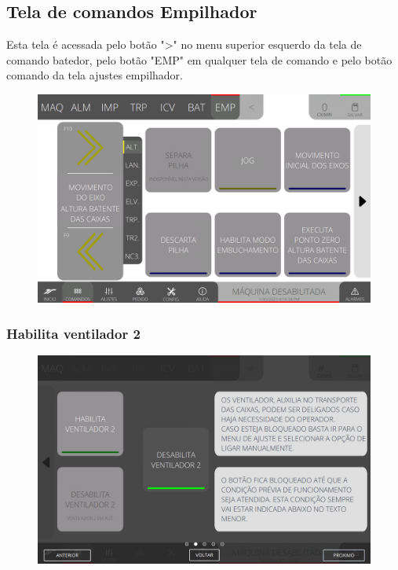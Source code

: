 \thispagestyle{fancy}
\vspace*{40 pt}
\subsection{Tela de comandos Empilhador} \label{sec:telaComandosEmpilhador}
Esta tela é acessada pelo botão "\textgreater" no menu superior esquerdo da tela de comando batedor, pelo botão "EMP" em qualquer tela de comando e pelo botão comando da tela ajustes empilhador.
\vspace*{\fill}
\begin{figure}[h]
    \centering
    \includegraphics[width=480 px,height=300 px]{src/imagesICV/08-stacker/commands/Tela-Principal.png}
\end{figure}
\vspace*{\fill}

\newpage
\thispagestyle{fancy}
\vspace*{40 pt}
\subsubsection{\small {Habilita ventilador 2}} \label{sec:telaComandosEmpilhadorHabilitaVentilador2}
\vspace*{\fill}
\begin{figure}[h]
    \centering
    \includegraphics[width=576 px,height=360 px]{src/imagesICV/08-stacker/commands/e-2.png}
\end{figure}
\vspace*{\fill}

